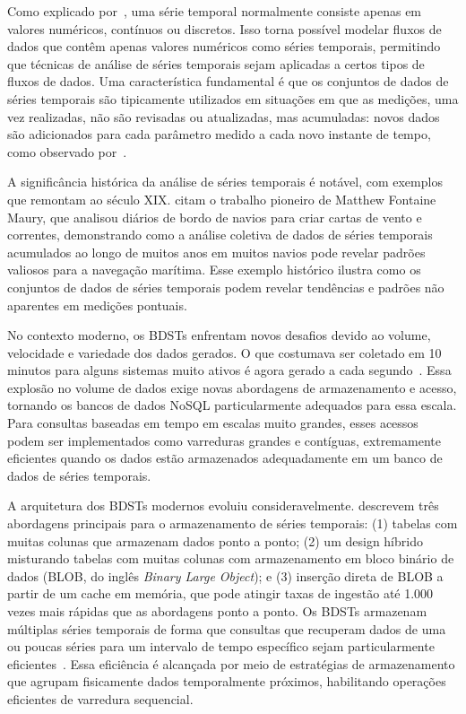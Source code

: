 Como explicado por~\cite{Ozsu2011}, uma série temporal normalmente consiste apenas em valores
numéricos, contínuos ou discretos. Isso torna possível modelar fluxos de dados que contêm apenas
valores numéricos como séries temporais, permitindo que técnicas de análise de séries temporais
sejam aplicadas a certos tipos de fluxos de dados. Uma característica fundamental é que os
conjuntos de dados de séries temporais são tipicamente utilizados em situações em que as medições,
uma vez realizadas, não são revisadas ou atualizadas, mas acumuladas: novos dados são
adicionados para cada parâmetro medido a cada novo instante de tempo, como observado
por~\cite{Dunning2014}.

A significância histórica da análise de séries temporais é notável, com exemplos que remontam
ao século XIX. \cite{Dunning2014} citam o trabalho pioneiro de Matthew Fontaine Maury, que
analisou diários de bordo de navios para criar cartas de vento e correntes, demonstrando como
a análise coletiva de dados de séries temporais acumulados ao longo de muitos anos em muitos
navios pode revelar padrões valiosos para a navegação marítima. Esse exemplo histórico ilustra
como os conjuntos de dados de séries temporais podem revelar tendências e padrões não aparentes
em medições pontuais.

No contexto moderno, os BDSTs enfrentam novos desafios devido ao volume, velocidade e variedade
dos dados gerados. O que costumava ser coletado em 10 minutos para alguns sistemas muito ativos
é agora gerado a cada segundo~\citep{Dunning2014}. Essa explosão no volume de dados exige novas
abordagens de armazenamento e acesso, tornando os bancos de dados NoSQL particularmente
adequados para essa escala. Para consultas baseadas em tempo em escalas muito grandes, esses
acessos podem ser implementados como varreduras grandes e contíguas, extremamente eficientes
quando os dados estão armazenados adequadamente em um banco de dados de séries temporais.

A arquitetura dos BDSTs modernos evoluiu consideravelmente. \cite{Dunning2014} descrevem três
abordagens principais para o armazenamento de séries temporais: (1) tabelas com muitas colunas que
armazenam dados ponto a ponto; (2) um design híbrido misturando tabelas com muitas colunas com armazenamento
em bloco binário de dados (BLOB, do inglês \textit{Binary Large Object}); e (3) inserção direta de BLOB a partir de um cache em memória, que pode atingir taxas
de ingestão até 1.000 vezes mais rápidas que as abordagens ponto a ponto. Os BDSTs armazenam
múltiplas séries temporais de forma que consultas que recuperam dados de uma ou poucas séries
para um intervalo de tempo específico sejam particularmente eficientes~\citep{Dunning2014}.
Essa eficiência é alcançada por meio de estratégias de armazenamento que agrupam fisicamente
dados temporalmente próximos, habilitando operações eficientes de varredura sequencial.

